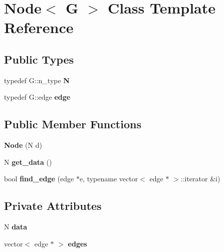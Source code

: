 \hypertarget{classNode}{\section{\-Node$<$ \-G $>$ \-Class \-Template \-Reference}
\label{classNode}
}
\subsection*{\-Public \-Types}
\begin{DoxyCompactItemize}
\item 
\hypertarget{classNode_a39931e6145bac4cc8b90e971e2661b00}{typedef \-G\-::n\-\_\-type {\bfseries \-N}}\label{classNode_a39931e6145bac4cc8b90e971e2661b00}

\item 
\hypertarget{classNode_ae9ffc12e2a55f34e32b8d28a783ab18e}{typedef \-G\-::edge {\bfseries edge}}\label{classNode_ae9ffc12e2a55f34e32b8d28a783ab18e}

\end{DoxyCompactItemize}
\subsection*{\-Public \-Member \-Functions}
\begin{DoxyCompactItemize}
\item 
\hypertarget{classNode_adf5acbf21eea9163776320e5a1ef7033}{{\bfseries \-Node} (\-N d)}\label{classNode_adf5acbf21eea9163776320e5a1ef7033}

\item 
\hypertarget{classNode_a6f8ec5675ac456aab55d7f875d795656}{\-N {\bfseries get\-\_\-data} ()}\label{classNode_a6f8ec5675ac456aab55d7f875d795656}

\item 
\hypertarget{classNode_a9619a72309d6671173d43ef6f649e342}{bool {\bfseries find\-\_\-edge} (edge $\ast$e, typename vector$<$ edge $\ast$ $>$\-::iterator \&i)}\label{classNode_a9619a72309d6671173d43ef6f649e342}

\end{DoxyCompactItemize}
\subsection*{\-Private \-Attributes}
\begin{DoxyCompactItemize}
\item 
\hypertarget{classNode_ae55fa4de690a5a3f0be1acceca145f2e}{\-N {\bfseries data}}\label{classNode_ae55fa4de690a5a3f0be1acceca145f2e}

\item 
\hypertarget{classNode_ab24a02e5cfb8b0f912d6d794f993d45c}{vector$<$ edge $\ast$ $>$ {\bfseries edges}}\label{classNode_ab24a02e5cfb8b0f912d6d794f993d45c}

\end{DoxyCompactItemize}
